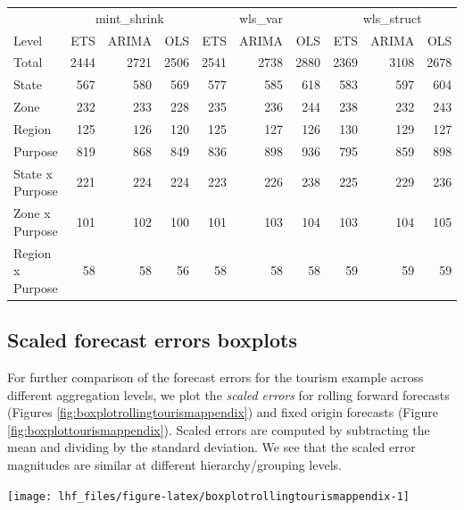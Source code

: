 \documentclass[11pt,a4paper,]{article}
\let\origfigure\figure
\let\endorigfigure\endfigure
\renewenvironment{figure}[1][2] {
    \expandafter\origfigure\expandafter[!htbp]
} {
    \endorigfigure
}
\let\origtable\table
\let\endorigtable\endtable
\renewenvironment{table}[1][2] {
    \expandafter\origtable\expandafter[!htbp]
} {
    \endorigtable
}
\begin{document}
\begin{table}

\caption{\label{tab:Tourismdatadifrecfix}Comparing Mean(RMSE) of three   different reconciliation matrices for fixed origin forecasts on a 24 months test set.}
\centering
\begin{tabular}[t]{lrrrrrrrrr}
\toprule
\multicolumn{1}{c}{} & \multicolumn{3}{c}{mint\_shrink} & \multicolumn{3}{c}{wls\_var} & \multicolumn{3}{c}{wls\_struct} \\
\cmidrule(l{3pt}r{3pt}){2-4} \cmidrule(l{3pt}r{3pt}){5-7} \cmidrule(l{3pt}r{3pt}){8-10}
Level & ETS & ARIMA & OLS & ETS & ARIMA & OLS & ETS & ARIMA & OLS\\
\midrule
Total & 2444 & 2721 & 2506 & 2541 & 2738 & 2880 & 2369 & 3108 & 2678\\
State & 567 & 580 & 569 & 577 & 585 & 618 & 583 & 597 & 604\\
Zone & 232 & 233 & 228 & 235 & 236 & 244 & 238 & 232 & 243\\
Region & 125 & 126 & 120 & 125 & 127 & 126 & 130 & 129 & 127\\
Purpose & 819 & 868 & 849 & 836 & 898 & 936 & 795 & 859 & 898\\
State x Purpose & 221 & 224 & 224 & 223 & 226 & 238 & 225 & 229 & 236\\
Zone x Purpose & 101 & 102 & 100 & 101 & 103 & 104 & 103 & 104 & 105\\
Region x Purpose & 58 & 58 & 56 & 58 & 58 & 58 & 59 & 59 & 59\\
\bottomrule
\end{tabular}
\end{table}

\hypertarget{scaled-forecast-errors-boxplots}{%
\subsection{Scaled forecast errors boxplots}\label{scaled-forecast-errors-boxplots}}

For further comparison of the forecast errors for the tourism example across different aggregation levels, we plot the \emph{scaled errors} for rolling forward forecasts (Figures \ref{fig:boxplotrollingtourismappendix}) and fixed origin forecasts (Figure \ref{fig:boxplottourismappendix}). Scaled errors are computed by subtracting the mean and dividing by the standard deviation. We see that the scaled error magnitudes are similar at different hierarchy/grouping levels.

\begin{figure}

{\centering \texttt{[image: lhf\_files/figure-latex/boxplotrollingtourismappendix-1]} 

}

\caption{Box plots of scaled forecast errors from reconciled and unreconciled ETS, ARIMA, and OLS rolling origin forecasts for tourism demand data. Panels are different hierarchy levels.}\label{fig:boxplotrollingtourismappendix}
\end{figure}
\end{document}
